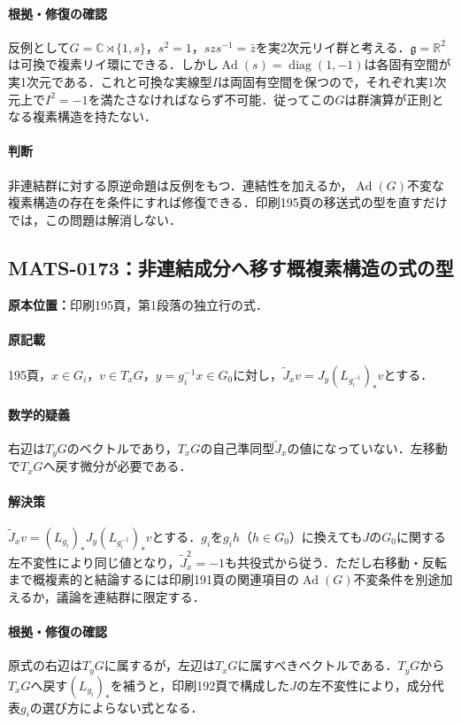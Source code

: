 \documentclass[a4paper,10pt]{ltjsarticle}
\begin{document}
\paragraph{根拠・修復の確認}反例として$G=\mathbb C\rtimes\{1,s\}$，$s^2=1$，$szs^{-1}=\bar z$を実2次元リイ群と考える．$\mathfrak g=\mathbb R^2$は可換で複素リイ環にできる．しかし$\operatorname{Ad}(s)=\operatorname{diag}(1,-1)$は各固有空間が実1次元である．これと可換な実線型$I$は両固有空間を保つので，それぞれ実1次元上で$I^2=-1$を満たさなければならず不可能．従ってこの$G$は群演算が正則となる複素構造を持たない．

\paragraph{判断}非連結群に対する原逆命題は反例をもつ．連結性を加えるか，$\operatorname{Ad}(G)$不変な複素構造の存在を条件にすれば修復できる．印刷195頁の移送式の型を直すだけでは，この問題は解消しない．


\subsection*{MATS-0173：非連結成分へ移す概複素構造の式の型}\label{math:MATS-0173}
\noindent\textbf{原本位置：}印刷195頁，第1段落の独立行の式．

\paragraph{原記載}195頁，$x\in G_i$，$v\in T_xG$，$y=g_i^{-1}x\in G_0$に対し，$\tilde J_xv=J_y(L_{g_i^{-1}})_*v$とする．

\paragraph{数学的疑義}右辺は$T_yG$のベクトルであり，$T_xG$の自己準同型$\tilde J_x$の値になっていない．左移動で$T_xG$へ戻す微分が必要である．

\paragraph{解決策}$\tilde J_xv=(L_{g_i})_*J_y(L_{g_i^{-1}})_*v$とする．$g_i$を$g_ih$（$h\in G_0$）に換えても$J$の$G_0$に関する左不変性により同じ値となり，$\tilde J_x^2=-1$も共役式から従う．ただし右移動・反転まで概複素的と結論するには印刷191頁の関連項目の$\operatorname{Ad}(G)$不変条件を別途加えるか，議論を連結群に限定する．

\paragraph{根拠・修復の確認}原式の右辺は$T_yG$に属するが，左辺は$T_xG$に属すべきベクトルである．$T_yG$から$T_xG$へ戻す$(L_{g_i})_*$を補うと，印刷192頁で構成した$J$の左不変性により，成分代表$g_i$の選び方によらない式となる．
\end{document}
